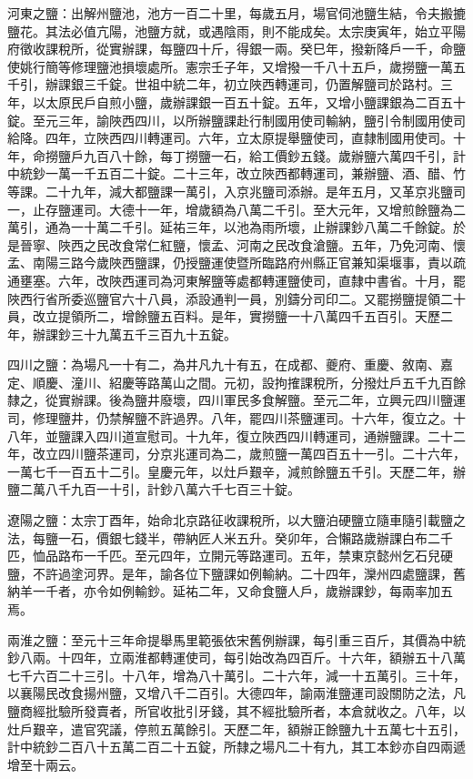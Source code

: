 \begin{pinyinscope}
 河東之鹽：出解州鹽池，池方一百二十里，每歲五月，場官伺池鹽生結，令夫搬摝鹽花。其法必值亢陽，池鹽方就，或遇陰雨，則不能成矣。太宗庚寅年，始立平陽府徵收課稅所，從實辦課，每鹽四十斤，得銀一兩。癸巳年，撥新降戶一千，命鹽使姚行簡等修理鹽池損壞處所。憲宗壬子年，又增撥一千八十五戶，歲撈鹽一萬五千引，辦課銀三千錠。世祖中統二年，初立陜西轉運司，仍置解鹽司於路村。三年，以太原民戶自煎小鹽，歲辦課銀一百五十錠。五年，又增小鹽課銀為二百五十錠。至元三年，諭陜西四川，以所辦鹽課赴行制國用使司輸納，鹽引令制國用使司給降。四年，立陜西四川轉運司。六年，立太原提舉鹽使司，直隸制國用使司。十年，命撈鹽戶九百八十餘，每丁撈鹽一石，給工價鈔五錢。歲辦鹽六萬四千引，計中統鈔一萬一千五百二十錠。二十三年，改立陜西都轉運司，兼辦鹽、酒、醋、竹等課。二十九年，減大都鹽課一萬引，入京兆鹽司添辦。是年五月，又革京兆鹽司一，止存鹽運司。大德十一年，增歲額為八萬二千引。至大元年，又增煎餘鹽為二萬引，通為一十萬二千引。延祐三年，以池為雨所壞，止辦課鈔八萬二千餘錠。於是晉寧、陜西之民改食常仁紅鹽，懷孟、河南之民改食滄鹽。五年，乃免河南、懷孟、南陽三路今歲陜西鹽課，仍授鹽運使暨所臨路府州縣正官兼知渠堰事，責以疏通壅塞。六年，改陜西運司為河東解鹽等處都轉運鹽使司，直隸中書省。十月，罷陜西行省所委巡鹽官六十八員，添設通判一員，別鑄分司印二。又罷撈鹽提領二十員，改立提領所二，增餘鹽五百料。是年，實撈鹽一十八萬四千五百引。天歷二年，辦課鈔三十九萬五千三百九十五錠。



 四川之鹽：為場凡一十有二，為井凡九十有五，在成都、夔府、重慶、敘南、嘉定、順慶、潼川、紹慶等路萬山之間。元初，設拘搉課稅所，分撥灶戶五千九百餘隸之，從實辦課。後為鹽井廢壞，四川軍民多食解鹽。至元二年，立興元四川鹽運司，修理鹽井，仍禁解鹽不許過界。八年，罷四川茶鹽運司。十六年，復立之。十八年，並鹽課入四川道宣慰司。十九年，復立陜西四川轉運司，通辦鹽課。二十二年，改立四川鹽茶運司，分京兆運司為二，歲煎鹽一萬四百五十一引。二十六年，一萬七千一百五十二引。皇慶元年，以灶戶艱辛，減煎餘鹽五千引。天歷二年，辦鹽二萬八千九百一十引，計鈔八萬六千七百三十錠。



 遼陽之鹽：太宗丁酉年，始命北京路征收課稅所，以大鹽泊硬鹽立隨車隨引載鹽之法，每鹽一石，價銀七錢半，帶納匠人米五升。癸卯年，合懶路歲辦課白布二千匹，恤品路布一千匹。至元四年，立開元等路運司。五年，禁東京懿州乞石兒硬鹽，不許過塗河界。是年，諭各位下鹽課如例輸納。二十四年，灤州四處鹽課，舊納羊一千者，亦令如例輸鈔。延祐二年，又命食鹽人戶，歲辦課鈔，每兩率加五焉。



 兩淮之鹽：至元十三年命提舉馬里範張依宋舊例辦課，每引重三百斤，其價為中統鈔八兩。十四年，立兩淮都轉運使司，每引始改為四百斤。十六年，額辦五十八萬七千六百二十三引。十八年，增為八十萬引。二十六年，減一十五萬引。三十年，以襄陽民改食揚州鹽，又增八千二百引。大德四年，諭兩淮鹽運司設關防之法，凡鹽商經批驗所發賣者，所官收批引牙錢，其不經批驗所者，本倉就收之。八年，以灶戶艱辛，遣官究議，停煎五萬餘引。天歷二年，額辦正餘鹽九十五萬七十五引，計中統鈔二百八十五萬二百二十五錠，所隸之場凡二十有九，其工本鈔亦自四兩遞增至十兩云。




\end{pinyinscope}

